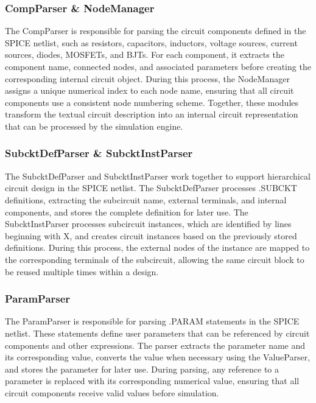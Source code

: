 \subsubsection{CompParser \& NodeManager}
The CompParser is responsible for parsing the circuit components defined in the SPICE netlist, such as resistors, capacitors, inductors, voltage sources, current sources, diodes, MOSFETs, and BJTs. For each component, it extracts the component name, connected nodes, and associated parameters before creating the corresponding internal circuit object. During this process, the NodeManager assigns a unique numerical index to each node name, ensuring that all circuit components use a consistent node numbering scheme. Together, these modules transform the textual circuit description into an internal circuit representation that can be processed by the simulation engine.

\subsubsection{SubcktDefParser \& SubcktInstParser}
The SubcktDefParser and SubcktInstParser work together to support hierarchical circuit design in the SPICE netlist. The SubcktDefParser processes .SUBCKT definitions, extracting the subcircuit name, external terminals, and internal components, and stores the complete definition for later use. The SubcktInstParser processes subcircuit instances, which are identified by lines beginning with X, and creates circuit instances based on the previously stored definitions. During this process, the external nodes of the instance are mapped to the corresponding terminals of the subcircuit, allowing the same circuit block to be reused multiple times within a design.

\subsubsection{ParamParser}
The ParamParser is responsible for parsing .PARAM statements in the SPICE netlist. These statements define user parameters that can be referenced by circuit components and other expressions. The parser extracts the parameter name and its corresponding value, converts the value when necessary using the ValueParser, and stores the parameter for later use. During parsing, any reference to a parameter is replaced with its corresponding numerical value, ensuring that all circuit components receive valid values before simulation.


